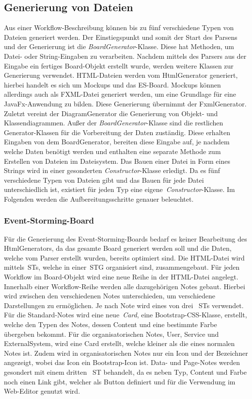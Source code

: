 \subsection{Generierung von Dateien}\label{subsec:generierung-von-dateien}
Aus einer Workflow-Beschreibung können bis zu fünf verschiedene Typen von Dateien generiert werden.
Der Einstiegspunkt und somit der Start des Parsens und der Generierung ist die \textit{BoardGenerator}-Klasse.
Diese hat Methoden, um Datei- oder String-Eingaben zu verarbeiten.
Nachdem mittels des Parsers aus der Eingabe ein fertiges Board-Objekt erstellt wurde, werden weitere Klassen zur Generierung verwendet.
HTML-Dateien werden vom HtmlGenerator generiert, hierbei handelt es sich um Mockups und das \ac{ES}-Board.
Mockups können allerdings auch als FXML-Datei generiert werden, um eine Grundlage für eine JavaFx-Anwendung zu bilden.
Diese Generierung übernimmt der FxmlGenerator.
Zuletzt vereint der DiagramGenerator die Generierung von Objekt- und Klassendiagrammen.
Außer der \textit{BoardGenerator}-Klasse sind die restlichen Generator-Klassen für die Vorbereitung der Daten zuständig.
Diese erhalten Eingaben von dem BoardGenerator, bereiten diese Eingabe auf, je nachdem welche Daten benötigt werden und enthalten eine
separate Methode zum Erstellen von Dateien im Dateisystem.
Das Bauen einer Datei in Form eines Strings wird in einer gesonderten \textit{Constructor}-Klasse erledigt.
Da es fünf verschiedene Typen von Dateien gibt und das Bauen für jede Datei unterschiedlich ist, existiert für jeden Typ eine eigene~\textit{Constructor}-Klasse.
Im Folgenden werden die Aufbereitungsschritte genauer beleuchtet.

\subsubsection{Event-Storming-Board}
Für die Generierung des Event-Storming-Boards bedarf es keiner Bearbeitung des HtmlGenerators, da das gesamte Board generiert werden soll und die Daten,
welche vom Parser erstellt wurden, bereits optimiert sind.
Die HTML-Datei wird mittels~\acp{ST}, welche in einer~\ac{STG} organisiert sind, zusammengebaut.
Für jeden Workflow im Board-Objekt wird eine neue Reihe in der HTML-Datei angelegt.
Innerhalb einer Workflow-Reihe werden alle dazugehörigen Notes gebaut.
Hierbei wird zwischen den verschiedenen Notes unterschieden, um verschiedene Darstellungen zu ermöglichen.
Je nach Note wird eines von drei ~\acp{ST} verwendet.
Für die Standard-Notes wird eine neue~\textit{Card}, eine Bootstrap-CSS-Klasse, erstellt, welche den Typen des Notes, dessen Content und eine bestimmte Farbe übergeben bekommt.
Für die organisatorischen Notes, User, Service und ExternalSystem, wird eine Card erstellt, welche kleiner als die eines normalen Notes ist.
Zudem wird in organisatorischen Notes nur ein Icon und der Bezeichner angezeigt, wobei das Icon ein Bootstrap-Icon ist.
Data- und Page-Notes werden gesondert mit einem dritten ~\ac{ST} behandelt, da es neben Typ, Content und Farbe noch einen Link gibt, welcher als Button definiert und für die Verwendung
im Web-Editor genutzt wird.

